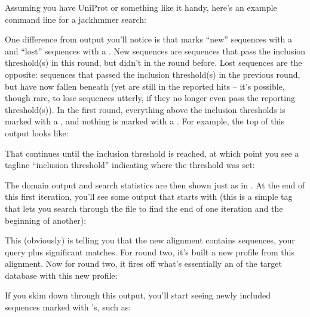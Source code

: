 Assuming you have UniProt or something like it handy, here's an
example command line for a jackhmmer search:

   \vspace{1ex}
   \vspace{1ex}

One difference from  output you'll notice is that
 marks ``new'' sequences with a \mono{+} and ``lost''
sequences with a \mono{-}. New sequences are sequences that pass the
inclusion threshold(s) in this round, but didn't in the round before.
Lost sequences are the opposite: sequences that passed the inclusion
threshold(s) in the previous round, but have now fallen beneath (yet
are still in the reported hits -- it's possible, though rare, to lose
sequences utterly, if they no longer even pass the reporting
threshold(s)).  In the first round, everything above the inclusion
thresholds is marked with a \mono{+}, and nothing is marked with a
\mono{-}. For example, the top of this output looks like:


That continues until the inclusion threshold is reached, at which
point you see a tagline ``inclusion threshold'' indicating where the
threshold was set:


The domain output and search statistics are then shown just as in
. At the end of this first iteration, you'll see some
output that starts with  (this is a simple tag that lets you
search through the file to find the end of one iteration and the
beginning of another):


This (obviously) is telling you that the new alignment contains \JHUninc{}
sequences, your query plus \JHUnsig{} significant matches. For round two,
it's built a new profile from this alignment. Now for round two, it
fires off what's essentially an  of the target
database with this new profile:


If you skim down through this output, you'll start seeing newly
included sequences marked with \mono{+}'s, such as:


